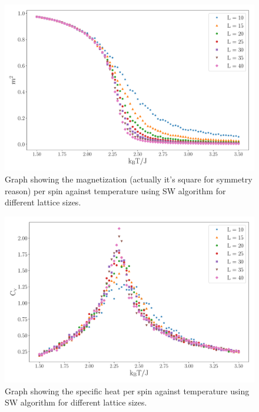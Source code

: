 \documentclass[a4paper,8pt]{article}
\begin{document}
\begin{figure}[htbp]
    \centering
    \includegraphics[scale = 0.4]{triple_2000_magnetisation.pdf}
    \caption{Graph showing the magnetization (actually it's square for symmetry reason) per spin against temperature using SW algorithm for different lattice sizes.}
    \label{fig:mani}
\end{figure}

\begin{figure}[htbp]
    \centering
    \includegraphics[scale = 0.4]{triple_2000_c_v.pdf}
    \caption{Graph showing the specific heat per spin against temperature using SW algorithm for different lattice sizes.}
    \label{fig:cv}
\end{figure}
\end{document}
